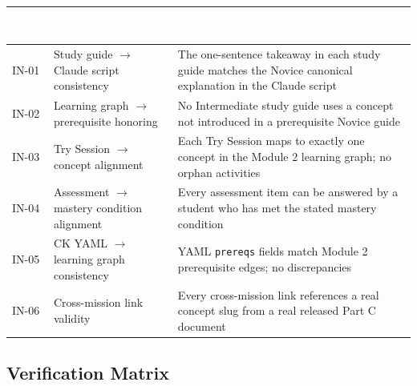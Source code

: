\documentclass[11pt,letterpaper]{article}
\newcommand{\tableheader}[1]{\textbf{\sffamily\textcolor{white}{#1}}}
\begin{document}
\begin{center}
\begin{tabularx}{\textwidth}{L{1.5cm}L{4cm}X}
\toprule
{}
\tableheader{Test ID} & \tableheader{Cross-Module Check} & \tableheader{Expected Result} \\
\midrule
IN-01 & Study guide $\to$ Claude script consistency & The one-sentence takeaway in each study guide matches the Novice canonical explanation in the Claude script \\
IN-02 & Learning graph $\to$ prerequisite honoring & No Intermediate study guide uses a concept not introduced in a prerequisite Novice guide \\
IN-03 & Try Session $\to$ concept alignment & Each Try Session maps to exactly one concept in the Module 2 learning graph; no orphan activities \\
IN-04 & Assessment $\to$ mastery condition alignment & Every assessment item can be answered by a student who has met the stated mastery condition \\
IN-05 & CK YAML $\to$ learning graph consistency & YAML \texttt{prereqs} fields match Module 2 prerequisite edges; no discrepancies \\
IN-06 & Cross-mission link validity & Every cross-mission link references a real concept slug from a real released Part C document \\
\bottomrule
\end{tabularx}
\end{center}

\subsection{Verification Matrix}
\end{document}

